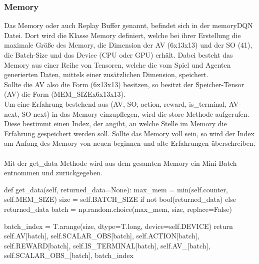 \subsubsection{Memory} \label{sec:Implementierung_Memory}
Das Memory oder auch Replay Buffer genannt, befindet sich in der memoryDQN Datei. Dort wird die Klasse Memory definiert, welche bei ihrer Erstellung die maximale Größe des Memory, die Dimension der AV (6x13x13) und der SO (41), die Batch-Size und das Device (CPU oder GPU) erhält.
Dabei besteht das Memory aus einer Reihe von Tensoren, welche die vom Spiel und Agenten generierten Daten, mittels einer zusätzlichen Dimension, speichert.\\
Sollte die AV also die Form (6x13x13) besitzen, so besitzt der Speicher-Tensor (AV) die Form (MEM\_SIZEx6x13x13).\\
Um eine Erfahrung bestehend aus (AV, SO, action, reward, is\_terminal, AV-next, SO-next) in das Memory einzupflegen, wird die store Methode aufgerufen. Diese bestimmt einen Index, der angibt, an welche Stelle im Memory die Erfahrung gespeichert werden soll. Sollte das Memory voll sein, so wird der Index am Anfang des Memory von neuen beginnen und alte Erfahrungen überschreiben.\\
\\Mit der get\_data Methode wird aus dem gesamten Memory ein Mini-Batch entnommen und zurückgegeben.
\begin{python}
	def get_data(self, returned_data=None):
		max_mem = min(self.counter, self.MEM_SIZE)
		size = self.BATCH_SIZE if not bool(returned_data) else returned_data
		batch = np.random.choice(max_mem, size, replace=False)
		
		batch_index = T.arange(size, dtype=T.long, device=self.DEVICE)
		return self.AV[batch], self.SCALAR_OBS[batch], self.ACTION[batch], self.REWARD[batch], self.IS_TERMINAL[batch], self.AV_[batch], self.SCALAR_OBS_[batch], batch_index
\end{python}

